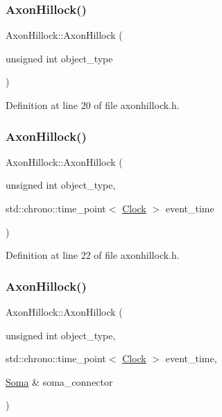 \subsubsection{\texorpdfstring{Axon\+Hillock()}{AxonHillock()}\hspace{0.1cm}{\footnotesize\ttfamily [2/4]}}
{\footnotesize\ttfamily Axon\+Hillock\+::\+Axon\+Hillock (\begin{DoxyParamCaption}\item[{unsigned int}]{object\+\_\+type }\end{DoxyParamCaption})\hspace{0.3cm}{\ttfamily [inline]}}



Definition at line 20 of file axonhillock.\+h.

\mbox{\label{class_axon_hillock_acc61c61c8dfddd603e868a2fcbfd5e9c}} 
\subsubsection{\texorpdfstring{Axon\+Hillock()}{AxonHillock()}\hspace{0.1cm}{\footnotesize\ttfamily [3/4]}}
{\footnotesize\ttfamily Axon\+Hillock\+::\+Axon\+Hillock (\begin{DoxyParamCaption}\item[{unsigned int}]{object\+\_\+type,  }\item[{std\+::chrono\+::time\+\_\+point$<$ \mbox{\hyperlink{universe_8h_a0ef8d951d1ca5ab3cfaf7ab4c7a6fd80}{Clock}} $>$}]{event\+\_\+time }\end{DoxyParamCaption})\hspace{0.3cm}{\ttfamily [inline]}}



Definition at line 22 of file axonhillock.\+h.

\mbox{\label{class_axon_hillock_a250945e24a51475369b6c7881c0d955b}} 
\subsubsection{\texorpdfstring{Axon\+Hillock()}{AxonHillock()}\hspace{0.1cm}{\footnotesize\ttfamily [4/4]}}
{\footnotesize\ttfamily Axon\+Hillock\+::\+Axon\+Hillock (\begin{DoxyParamCaption}\item[{unsigned int}]{object\+\_\+type,  }\item[{std\+::chrono\+::time\+\_\+point$<$ \mbox{\hyperlink{universe_8h_a0ef8d951d1ca5ab3cfaf7ab4c7a6fd80}{Clock}} $>$}]{event\+\_\+time,  }\item[{\mbox{\hyperlink{class_soma}{Soma}} \&}]{soma\+\_\+connector }\end{DoxyParamCaption})\hspace{0.3cm}{\ttfamily [inline]}}



